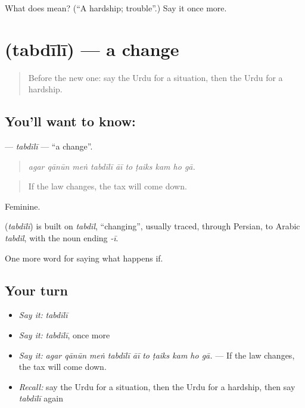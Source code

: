 \begin{tcolorbox}[breakable,colback=teal!4,colframe=teal!35!black,title={Before you move on}]
What does  mean? (\textquotedblleft{}A hardship; trouble\textquotedblright{}.) Say it once more.
\end{tcolorbox}
\section[\texorpdfstring{\ur{تبدیلی} (tabdīlī)}{تبدیلی (tabdīlī)}]{ (tabdīlī) — a change}

\label{lesson:UR-C365-tabdili}



\begin{quote}
Before the new one: say the Urdu for a situation, then the Urdu for a hardship.
\end{quote}

\subsection*{You'll want to know: }
\textbf{} — \emph{tabdīlī} — \textquotedblleft{}a change\textquotedblright{}.

\begin{quote}
         
\end{quote}

\begin{quote}
\emph{agar qānūn meṅ tabdīlī āī to ṭaiks kam ho gā.}
\end{quote}

\begin{quote}
If the law changes, the tax will come down.
\end{quote}

Feminine.

\begin{cousinweb}
\textbf{} (\emph{tabdīlī}) is built on \emph{tabdīl}, \textquotedblleft{}changing\textquotedblright{}, usually traced, through Persian, to Arabic \emph{tabdīl}, with the noun ending \emph{-ī}.
\end{cousinweb}

\begin{grammarlens}[title={What you've built}]
One more word for saying what happens if.
\end{grammarlens}

\subsection*{Your turn}
\begin{itemize}
\raggedright
  \item \emph{Say it:} \emph{tabdīlī}
  \item \emph{Say it:} \emph{tabdīlī}, once more
  \item \emph{Say it:} \emph{agar qānūn meṅ tabdīlī āī to ṭaiks kam ho gā.} — If the law changes, the tax will come down.
  \item \emph{Recall:} say the Urdu for a situation, then the Urdu for a hardship, then say \emph{tabdīlī} again
\end{itemize}

